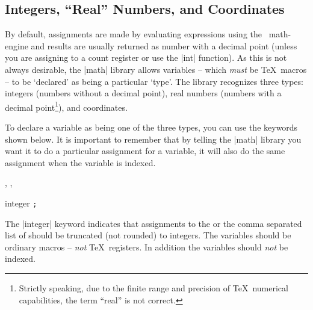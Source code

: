 \subsection{Integers, ``Real'' Numbers, and Coordinates}
  
  By default, assignments are made by evaluating expressions
  using the \pgfname\ math-engine and 
  results  are usually returned as number with a decimal point (unless you
  are assigning to a count register or use the |int| function).
  As this is not always desirable, the |math| library allows
  variables -- which \emph{must} be \TeX\ macros -- to be `declared'
  as being a particular `type'. The library recognizes three types:
  integers (numbers without a decimal point),
  real numbers (numbers with a decimal point\footnote{Strictly speaking, due to the 
  finite range and precision of \TeX\ numerical capabilities, the term ``real'' is
  not correct.}), and coordinates.
  
  To declare a variable as being one of the three types,
  you  can use the keywords shown below. It is important to remember
  that by telling the |math| library you want it to do a
  particular assignment for a variable, it will also do the same 
  assignment when the variable is indexed.
  
\begin{codeexample}[]
, , 
\end{codeexample}



\begin{math-keyword}{{integer} \texttt{;}}

  The |integer| keyword indicates that assignments to the  or 
  the comma separated list of  should be 
  truncated (not rounded) to integers. The variables should be ordinary 
  macros -- \emph{not} \TeX\ registers. In addition the variables
  should \emph{not} be indexed. 

\begin{codeexample}[]
\end{codeexample}

\end{math-keyword}

